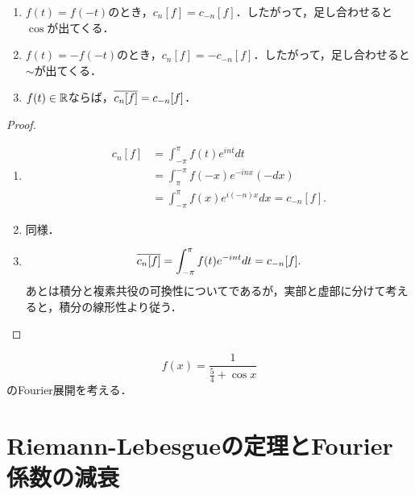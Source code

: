 \documentclass[uplatex,dvipdfmx]{jsreport}
\begin{document}
\begin{lemma}\mbox{}
    \begin{enumerate}
        \item $f(t)=f(-t)$のとき，$c_n[f]=c_{-n}[f]$．したがって，足し合わせると$\cos$が出てくる．
        \item $f(t)=-f(-t)$のとき，$c_n[f]=-c_{-n}[f]$．したがって，足し合わせると$\sim$が出てくる．
        \item $f(t)\in\mathbb{R}$ならば，$\overline{c_n[f]}=c_{-n}[f]$．
    \end{enumerate}
\end{lemma}
\begin{proof}\mbox{}
    \begin{enumerate}
        \item \begin{align*}
            c_n[f]&=\int^\pi_{-\pi}f(t)e^{int}dt\\
            &=\int_{\pi}^{-\pi}f(-x)e^{-inx}(-dx)\\
            &=\int_{-\pi}^{\pi}f(x)e^{i(-n)x}dx=c_{-n}[f].
        \end{align*}
        \item 同様．
        \item \[\overline{c_n[f]}=\int^\pi_{-\pi}f(t)e^{-int}dt=c_{-n}[f].\]
        あとは積分と複素共役の可換性についてであるが，実部と虚部に分けて考えると，積分の線形性より従う．
    \end{enumerate}
\end{proof}

\begin{example}
    \[f(x)=\frac{1}{\frac{5}{4}+\cos x}\]
    のFourier展開を考える．
\end{example}

\section{Riemann-Lebesgueの定理とFourier係数の減衰}
\end{document}
